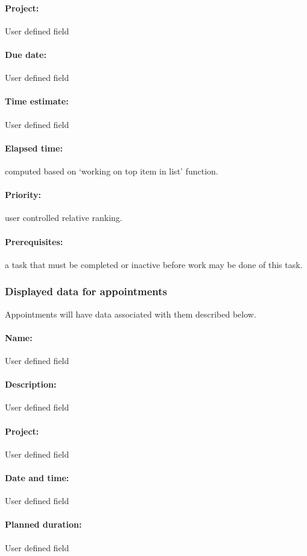 \documentclass[12pt,a4paper]{article}
\begin{document}
\paragraph{Project:} User defined field
\paragraph{Due date:} User defined field
\paragraph{Time estimate:} User defined field
\paragraph{Elapsed time:} computed based on `working on top item in list' function.
\paragraph{Priority:} user controlled relative ranking.
\paragraph{Prerequisites:} a task that must be completed or inactive before work may be done of this task.

\subsubsection{Displayed data for appointments}
Appointments will have data associated with them described below.
\paragraph{Name:} User defined field
\paragraph{Description:} User defined field
\paragraph{Project:} User defined field
\paragraph{Date and time:} User defined field
\paragraph{Planned duration:} User defined field
\end{document}
